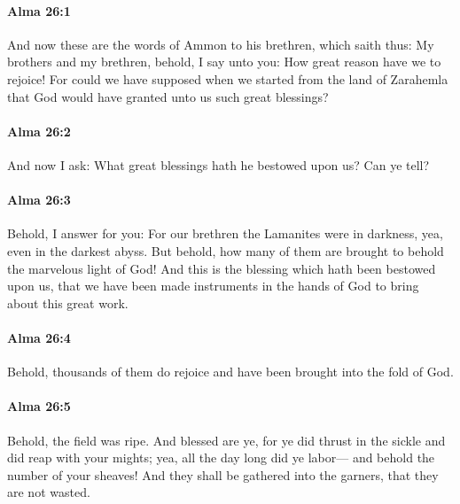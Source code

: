 		\paragraph{Alma 26:1} %
			\label{ALMA-26-1}

			And now these are the words of Ammon to his brethren, which saith thus:
			My brothers and my brethren, behold, I say unto you:
			How great reason have we to rejoice!
			For could we have supposed when we started from the land of Zarahemla
			that God would have granted unto us such great blessings?

		\paragraph{Alma 26:2} %
			\label{ALMA-26-2}

			And now I ask:
			What great blessings hath he bestowed upon us?
			Can ye tell?

		\paragraph{Alma 26:3} %
			\label{ALMA-26-3}

			Behold, I answer for you:
			For our brethren the Lamanites were in darkness,
			yea, even in the darkest abyss.
			But behold, how many of them are brought to behold the marvelous light of God!
			And this is the blessing which hath been bestowed upon us,
			that we have been made instruments in the hands of God
			to bring about this great work.

		\paragraph{Alma 26:4} %
			\label{ALMA-26-4}

			Behold, thousands of them do rejoice
			and have been brought into the fold of God.

		\paragraph{Alma 26:5} %
			\label{ALMA-26-5}

			Behold, the field was ripe.
			And blessed are ye,
			for ye did thrust in the sickle and did reap with your mights;
			yea, all the day long did ye labor---
			and behold the number of your sheaves!
			And they shall be gathered into the garners, that they are not wasted.

